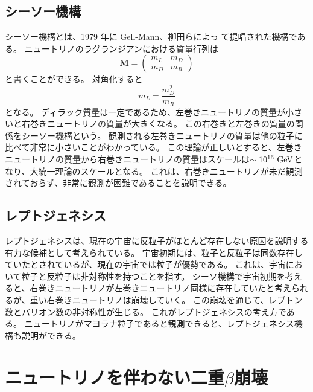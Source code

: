 \documentclass[a4paper,10pt]{jreport}
\begin{document}
\subsection{シーソー機構}

シーソー機構とは、1979 年に Gell-Mann、柳田らによっ て提唱された機構である。
ニュートリノのラグランジアンにおける質量行列は
\begin{equation} \label{Eq-MassMatrix}
	\bm{M} =
	\left(
		\begin{array}{cc}
		m_L & m_D \\
		m_D & m_R
		\end{array}
	\right)
\end{equation}
と書くことができる。
対角化すると
\begin{equation} \label{Eq-Seesaw}
	m_L=\frac{m_D^2}{m_R}
\end{equation}
となる。
ディラック質量は一定であるため、左巻きニュートリノの質量が小さいと右巻きニュートリノの質量が大きくなる。
この右巻きと左巻きの質量の関係をシーソー機構という。
観測される左巻きニュートリノの質量は他の粒子に比べて非常に小さいことがわかっている。
この理論が正しいとすると、左巻きニュートリノの質量から右巻きニュートリノの質量はスケールは$\sim 10^{16}\  \rm{GeV}$となり、大統一理論のスケールとなる。
これは、右巻きニュートリノが未だ観測されておらず、非常に観測が困難であることを説明できる。



\subsection{レプトジェネシス}

レプトジェネシスは、現在の宇宙に反粒子がほとんど存在しない原因を説明する有力な候補として考えられている。
宇宙初期には、粒子と反粒子は同数存在していたとされているが、現在の宇宙では粒子が優勢である。
これは、宇宙において粒子と反粒子は非対称性を持つことを指す。
シーソ機構で宇宙初期を考えると、右巻きニュートリノが左巻きニュートリノ同様に存在していたと考えられるが、重い右巻きニュートリノは崩壊していく。
この崩壊を通じて、レプトン数とバリオン数の非対称性が生じる。
これがレプトジェネシスの考え方である。
ニュートリノがマヨラナ粒子であると観測できると、レプトジェネシス機構も説明ができる。



\section{ニュートリノを伴わない二重$\beta$崩壊}
\end{document}

